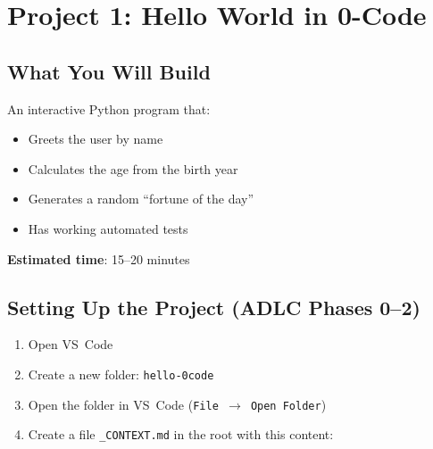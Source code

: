 \chapter{Project 1: Hello World in 0-Code}

\section*{What You Will Build}
An interactive Python program that:
\begin{itemize}
  \item Greets the user by name
  \item Calculates the age from the birth year
  \item Generates a random ``fortune of the day''
  \item Has working automated tests
\end{itemize}

\textbf{Estimated time}: 15--20 minutes

\section{Setting Up the Project (ADLC Phases 0--2)}

\begin{praticabox}[title={Hands-on --- Initial setup}]
\begin{enumerate}
  \item Open VS~Code
  \item Create a new folder: \texttt{hello-0code}
  \item Open the folder in VS~Code (\texttt{File $\rightarrow$ Open Folder})
  \item Create a file \texttt{\_CONTEXT.md} in the root with this content:
\end{enumerate}
\end{praticabox}

